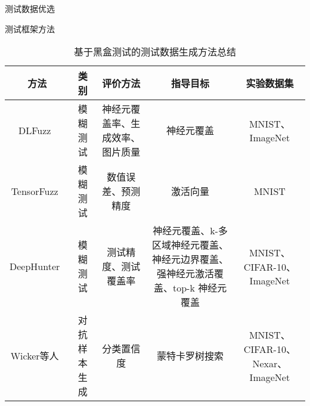 测试数据优选


测试框架方法




\begin{table}[t]
	\small
	\centering
	\caption{基于黑盒测试的测试数据生成方法总结}
	\label{tab:testingData_blackBox}
	\begin{tabular}{c|c|c|c|c}
		\toprule
		方法 & 类别 & 评价方法 & 指导目标 & 实验数据集 \\
		\midrule
		DLFuzz~\citess{Guo2018DLFuzz} & 模糊测试 & 神经元覆盖率、生成效率、图片质量 & 神经元覆盖 & MNIST、ImageNet \\
		\midrule
	    TensorFuzz~\citess{Odena2019TensorFuzz} & 模糊测试 & 数值误差、预测精度 & 激活向量 & MNIST \\
	    \midrule
	    DeepHunter~\citess{xie2019coverage} & 模糊测试 & 测试精度、测试覆盖率 & 神经元覆盖、k-多区域神经元覆盖、神经元边界覆盖、强神经元激活覆盖、top-k 神经元覆盖 & MNIST、CIFAR-10、ImageNet \\
	    \midrule
	    Wicker等人~\citess{Wicker2018FeatureGuided} & 对抗样本生成 & 分类置信度 & 蒙特卡罗树搜索 & MNIST、CIFAR-10、Nexar、ImageNet \\
	    
	    
		\bottomrule
	\end{tabular}
\end{table}


















\begin{spacing}{1.3} %
	 \songti
	
	
	\vspace{11bp}
\end{spacing}
